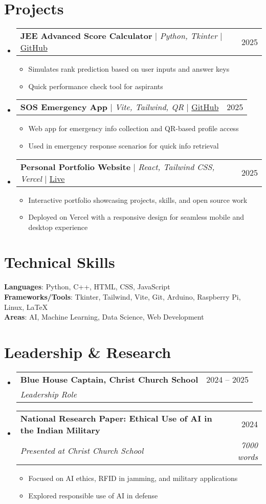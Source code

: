 \documentclass[letterpaper,11pt]{article}
\makeatletter
\newcommand{\resumeItem}[1]{
  \item\small{
    {#1 \vspace{-2pt}}
  }
}
\newcommand{\resumeSubheading}[4]{
  \vspace{-2pt}\item
    \begin{tabular*}{0.97\textwidth}[t]{l@{\extracolsep{\fill}}r}
      \textbf{#1} & #2 \\
      \textit{\small#3} & \textit{\small #4} \\
    \end{tabular*}\vspace{-7pt}
}
\newcommand{\resumeProjectHeading}[2]{
    \item
    \begin{tabular*}{0.97\textwidth}{l@{\extracolsep{\fill}}r}
      \small#1 & #2 \\
    \end{tabular*}\vspace{-7pt}
}
\newcommand{\resumeSubHeadingListStart}{\begin{itemize}[leftmargin=0.15in, label={}]}
\newcommand{\resumeSubHeadingListEnd}{\end{itemize}}
\newcommand{\resumeItemListStart}{\begin{itemize}}
\newcommand{\resumeItemListEnd}{\end{itemize}\vspace{-5pt}}
\makeatother
\begin{document}
\section{Projects}
   \resumeSubHeadingListStart
  \resumeProjectHeading
      {\textbf{JEE Advanced Score Calculator} $|$ \emph{Python, Tkinter} $|$ \href{https://github.com/Prabhav1437/JEE-ADV-Score-Calculator}{GitHub}}{2025}
      \resumeItemListStart
        \resumeItem{Simulates rank prediction based on user inputs and answer keys}
        \resumeItem{Quick performance check tool for aspirants}
      \resumeItemListEnd
  \resumeProjectHeading
      {\textbf{SOS Emergency App} $|$ \emph{Vite, Tailwind, QR} $|$ \href{https://github.com/Prabhav1437/sos-app}{GitHub}}{2025}
      \resumeItemListStart
        \resumeItem{Web app for emergency info collection and QR-based profile access}
        \resumeItem{Used in emergency response scenarios for quick info retrieval}
      \resumeItemListEnd
  \resumeProjectHeading
      {\textbf{Personal Portfolio Website} $|$ \emph{React, Tailwind CSS, Vercel} $|$ \href{https://react-based-profile.vercel.app/}{Live}}{2025}
      \resumeItemListStart
        \resumeItem{Interactive portfolio showcasing projects, skills, and open source work}
        \resumeItem{Deployed on Vercel with a responsive design for seamless mobile and desktop experience}
      \resumeItemListEnd
\resumeSubHeadingListEnd


\section{Technical Skills}
 \begin{itemize}[leftmargin=0.15in, label={}]
    \small{\item{
     \textbf{Languages}{: Python, C++, HTML, CSS, JavaScript} \\
     \textbf{Frameworks/Tools}{: Tkinter, Tailwind, Vite, Git, Arduino, Raspberry Pi, Linux, LaTeX} \\
     \textbf{Areas}{: AI, Machine Learning, Data Science, Web Development}
    }}
 \end{itemize}

\section{Leadership \& Research}
  \resumeSubHeadingListStart
    \resumeSubheading
      {Blue House Captain, Christ Church School}{2024 -- 2025}
      {Leadership Role}{}
    \resumeSubheading
      {National Research Paper: Ethical Use of AI in the Indian Military}{2024}
      {Presented at Christ Church School}{~7000 words}
      \resumeItemListStart
        \resumeItem{Focused on AI ethics, RFID in jamming, and military applications}
        \resumeItem{Explored responsible use of AI in defense}
      \resumeItemListEnd
  \resumeSubHeadingListEnd
\end{document}
